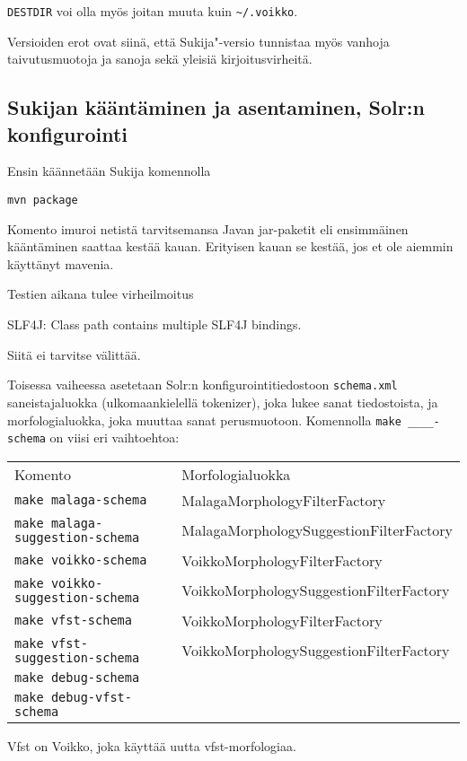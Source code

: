 \documentclass[12pt,a4paper]{scrartcl}
\begin{document}
\verb|DESTDIR| voi olla myös joitan muuta kuin \verb|~/.voikko|.

Versioiden erot ovat siinä, että Sukija"-versio tunnistaa myös vanhoja
taivutusmuotoja ja sanoja sekä yleisiä kirjoitusvirheitä.


\subsection*{Sukijan kääntäminen ja asentaminen, Solr:n konfigurointi}

Ensin käännetään Sukija komennolla

\verb=mvn package=

Komento imuroi netistä tarvitsemansa Javan jar-paketit eli ensimmäinen
kääntäminen saattaa kestää kauan. Erityisen kauan se kestää, jos et
ole aiemmin käyttänyt mavenia.

Testien aikana tulee virheilmoitus

SLF4J: Class path contains multiple SLF4J bindings.

Siitä ei tarvitse välittää.

\bigskip Toisessa vaiheessa asetetaan Solr:n konfigurointitiedostoon
\verb=schema.xml= saneistajaluokka (ulkomaankielellä tokenizer), joka
lukee sanat tiedostoista, ja morfologialuokka, joka muuttaa sanat
perusmuotoon. Komennolla \verb|make ____-schema| on viisi eri
vaihtoehtoa:

\begin{tabular}{@{}ll}
Komento                              & Morfologialuokka \\
\verb=make malaga-schema=            & MalagaMorphologyFilterFactory \\
\verb=make malaga-suggestion-schema= & MalagaMorphologySuggestionFilterFactory \\
\verb=make voikko-schema=            & VoikkoMorphologyFilterFactory \\
\verb=make voikko-suggestion-schema= & VoikkoMorphologySuggestionFilterFactory \\
\verb=make vfst-schema=              & VoikkoMorphologyFilterFactory \\
\verb=make vfst-suggestion-schema=   & VoikkoMorphologySuggestionFilterFactory \\
\verb=make debug-schema=             & \\
\verb=make debug-vfst-schema=
\end{tabular}

Vfst on Voikko, joka käyttää uutta vfst-morfologiaa.
\end{document}
